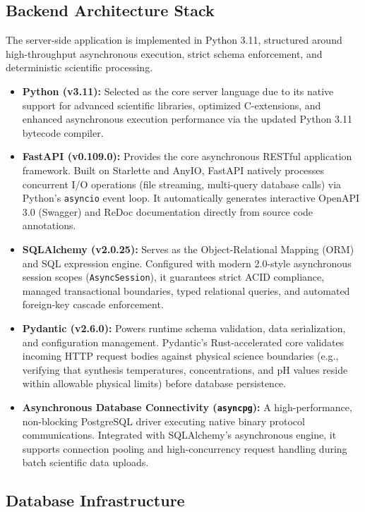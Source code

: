 \documentclass[12pt,a4paper,oneside]{report}
\begin{document}
{{{\subsection{Backend Architecture Stack}

The server-side application is implemented in Python 3.11, structured around high-throughput asynchronous execution, strict schema enforcement, and deterministic scientific processing.

\begin{itemize}
    \item \textbf{Python (v3.11):} Selected as the core server language due to its native support for advanced scientific libraries, optimized C-extensions, and enhanced asynchronous execution performance via the updated Python 3.11 bytecode compiler.
    \item \textbf{FastAPI (v0.109.0):} Provides the core asynchronous RESTful application framework. Built on Starlette and AnyIO, FastAPI natively processes concurrent I/O operations (file streaming, multi-query database calls) via Python's \texttt{asyncio} event loop. It automatically generates interactive OpenAPI 3.0 (Swagger) and ReDoc documentation directly from source code annotations.
    \item \textbf{SQLAlchemy (v2.0.25):} Serves as the Object-Relational Mapping (ORM) and SQL expression engine. Configured with modern 2.0-style asynchronous session scopes (\texttt{AsyncSession}), it guarantees strict ACID compliance, managed transactional boundaries, typed relational queries, and automated foreign-key cascade enforcement.
    \item \textbf{Pydantic (v2.6.0):} Powers runtime schema validation, data serialization, and configuration management. Pydantic's Rust-accelerated core validates incoming HTTP request bodies against physical science boundaries (e.g., verifying that synthesis temperatures, concentrations, and pH values reside within allowable physical limits) before database persistence.
    \item \textbf{Asynchronous Database Connectivity (\texttt{asyncpg}):} A high-performance, non-blocking PostgreSQL driver executing native binary protocol communications. Integrated with SQLAlchemy's asynchronous engine, it supports connection pooling and high-concurrency request handling during batch scientific data uploads.
\end{itemize}

\subsection{Database Infrastructure}

}}}
\end{document}
